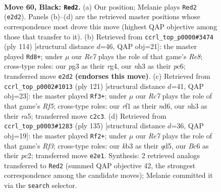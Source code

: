 \documentclass[11pt]{article}
\begin{document}
\clearpage

\begin{figure}[p]\centering
\begin{subfigure}{0.46\textwidth}\centering
\resizebox{\linewidth}{!}{%
\newchessgame
\chessboard[
  setfen={8/6k1/1pb5/p1p5/8/1K4PN/2r1rp1P/5R2 b - - 3 60},
  showmover=false,
  pgfstyle=straightmove, color=movearrow, markmove={e2-d2}
]}
\caption{}
\end{subfigure}\hfill
\begin{subfigure}{0.46\textwidth}\centering
\resizebox{\linewidth}{!}{%
\newchessgame
\chessboard[
  setfen={4R3/1p3r2/2p5/6p1/2PkP1r1/1P2R3/4K3/8 w - - 6 58},
  showmover=false,
  pgfstyle=straightmove, color=movearrow, markmove={e8-d8}
]}
\caption{}
\end{subfigure}
\\[4pt]
\begin{subfigure}{0.46\textwidth}\centering
\resizebox{\linewidth}{!}{%
\newchessgame
\chessboard[
  setfen={5k2/5p2/3N2p1/R2n2P1/P3pr2/1P4K1/8/8 b - - 0 61},
  showmover=false,
  pgfstyle=straightmove, color=movearrow, markmove={f4-f3}
]}
\caption{}
\end{subfigure}\hfill
\begin{subfigure}{0.46\textwidth}\centering
\resizebox{\linewidth}{!}{%
\newchessgame
\chessboard[
  setfen={8/1p4k1/p3rr2/3Q4/7P/P3p3/1PP1K3/8 b - - 17 68},
  showmover=false,
  pgfstyle=straightmove, color=movearrow, markmove={f6-f2}
]}
\caption{}
\end{subfigure}
\caption{\textbf{Move 60, Black: \texttt{Red2}.} (a) Our position; Melanie plays \texttt{Red2} (\texttt{e2d2}). Panels (b)--(d) are the retrieved master positions whose correspondence most drove this move (highest QAP objective among those that transfer to it). (b) Retrieved from \texttt{ccrl\_top\_p0000\#3474} (ply 114) [structural distance $d$=46, QAP obj=21]: the master played \texttt{Rd8+}; under $\mu$ our \emph{Re7} plays the role of that game's \emph{Re8}; cross-type roles: our \emph{p}g3 as their \emph{r}g4, our \emph{n}h3 as their \emph{p}c6; transferred move \texttt{e2d2} \textbf{(endorses this move)}. (c) Retrieved from \texttt{ccrl\_top\_p0002\#1013} (ply 121) [structural distance $d$=41, QAP obj=23]: the master played \texttt{Rf3+}; under $\mu$ our \emph{Rc7} plays the role of that game's \emph{Rf5}; cross-type roles: our \emph{r}f1 as their \emph{n}d6, our \emph{n}h3 as their \emph{r}a5; transferred move \texttt{c2c3}. (d) Retrieved from \texttt{ccrl\_top\_p0003\#1283} (ply 135) [structural distance $d$=36, QAP obj=19]: the master played \texttt{Rf2+}; under $\mu$ our \emph{Re7} plays the role of that game's \emph{Rf3}; cross-type roles: our \emph{k}b3 as their \emph{q}d5, our \emph{B}c6 as their \emph{p}c2; transferred move \texttt{e2e1}. Synthesis: 2 retrieved analogs transferred to \texttt{Red2} (summed QAP objective 42, the strongest correspondence among the candidate moves); Melanie committed it via the \texttt{search} selector.}
\label{fig:thought-m119}
\end{figure}
\end{document}
